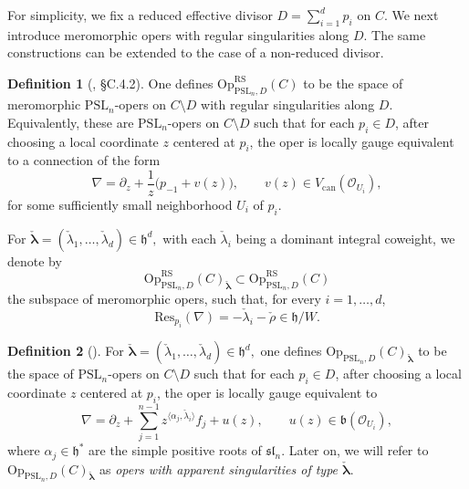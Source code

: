 \documentclass[twoside, 11pt]{article}
\numberwithin{equation}{section}
\theoremstyle{theorem}
\numberwithin{theorem}{section}
\theoremstyle{definition}
\newtheorem{definition}[definition]{Definition}
\begin{document}
For simplicity, we fix a reduced effective divisor
\(
D=\sum_{i=1}^d p_i
\)
on \(C\). 
We next introduce meromorphic opers with regular singularities along \(D\). 
The same constructions can be extended to the case of a non-reduced divisor.
\begin{definition}[\cite{Fr05}, \cite{BD05} §C.4.2]\label{def:global-meromorphic-oper}
One defines
\(
\mathrm{Op}_{\mathrm{PSL}_n,D}^{\mathrm{RS}}(C)
\)
to be the space of meromorphic \(\mathrm{PSL}_n\)-opers on \(C\setminus D\) with regular singularities along \(D\). 
Equivalently, these are \(\mathrm{PSL}_n\)-opers on \(C\setminus D\) such that for each \(p_i\in D\), after choosing a local coordinate \(z\) centered at \(p_i\), the oper is locally gauge equivalent to a connection of the form
\begin{equation}\label{eq:global-RS-oper}
\nabla
=
\partial_z+\frac{1}{z}\bigl(p_{-1}+v(z)\bigr),
\qquad
v(z)\in V_{\mathrm{can}}(\mathcal{O}_{U_i}),
\end{equation}
for some sufficiently small neighborhood \(U_i\) of \(p_i\).

For
\(
\boldsymbol{\check\lambda}=(\check\lambda_1,\dots,\check\lambda_d)\in \mathfrak h^d,
\)
with each \(\check\lambda_i\) being a dominant integral coweight,
we denote by
\[
\mathrm{Op}_{\mathrm{PSL}_n,D}^{\mathrm{RS}}(C)_{\boldsymbol{\check\lambda}}
\subset
\mathrm{Op}_{\mathrm{PSL}_n,D}^{\mathrm{RS}}(C)
\]
the subspace of meromorphic opers, such that, for every \(i=1,\dots,d\),
\[
\mathrm{Res}_{p_i}(\nabla)=-\check\lambda_i-\check\rho \in \mathfrak h/W.
\]
\end{definition}

\begin{definition}[\cite{Fr05}]\label{def:global-apparent-oper}
For
\(
\boldsymbol{\check\lambda}=(\check\lambda_1,\dots,\check\lambda_d)\in \mathfrak h^d,
\)
one defines
\(
\mathrm{Op}_{\mathrm{PSL}_n,D}(C)_{\boldsymbol{\check\lambda}}
\)
to be the space of \(\mathrm{PSL}_n\)-opers on \(C\setminus D\) such that for each \(p_i\in D\), after choosing a local coordinate \(z\) centered at \(p_i\), the oper is locally gauge equivalent to
\begin{equation}\label{eq:global-apparent-oper}
\nabla
=
\partial_z+\sum_{j=1}^{n-1} z^{\langle \alpha_j,\check\lambda_i\rangle}f_j + u(z),
\qquad
u(z)\in \mathfrak b(\mathcal{O}_{U_i}),
\end{equation}
where \(\alpha_j\in \mathfrak h^*\) are the simple positive roots of \(\mathfrak{sl}_n\). Later on, we will refer to 
\(
\mathrm{Op}_{\mathrm{PSL}_n,D}(C)_{\boldsymbol{\check\lambda}}
\)
as \emph{opers with apparent singularities of type \(\boldsymbol{\check\lambda}\)}.
\end{definition}
\end{document}
